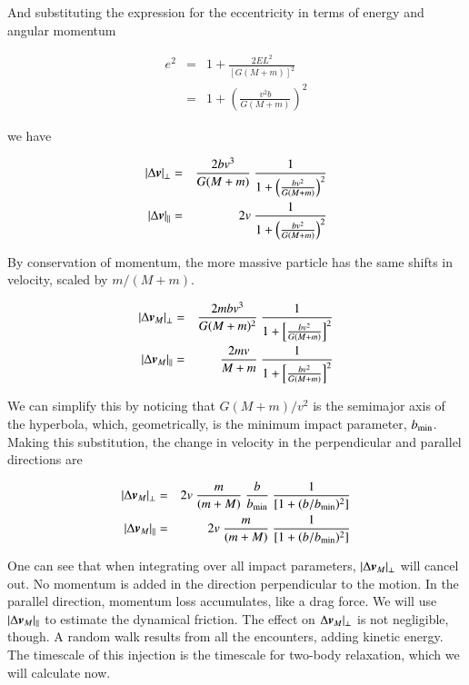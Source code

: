 And substituting the expression for the eccentricity in terms of energy and angular momentum

\begin{eqnarray}
e^2 &=& 1 + \frac{2EL^2}{[G(M+m)]^2} \\
    &=& 1 + \left(\frac{v^2b}{G(M+m)}\right)^2
\end{eqnarray}


we have 

\begin{eqnarray}
|\Delta \v{v}|_\perp &=& \frac{2bv^3}{G(M+m)} \ \frac{1}{1+  \left(\frac{bv^2}{G(M+m)}\right)^2       }\\
|\Delta \v{v}|_{||} &=& 2v \ \frac{1}{ 1+  \left(\frac{bv^2}{G(M+m)}\right)^2   }
\end{eqnarray}

By conservation of momentum, the more massive particle has the same shifts in velocity, scaled by $m/(M+m)$. 


\begin{eqnarray}
|\Delta \v{v}_{M}|_\perp &=& \frac{2mbv^3}{G(M+m)^2} \ \frac{1}{1+  \left[\frac{bv^2}{G(M+m)}\right]^2       }\\
|\Delta \v{v}_{M}|_{||} &=& \frac{2mv}{M+m} \ \frac{1}{ 1+  \left[\frac{bv^2}{G(M+m)}\right]^2   }
\end{eqnarray}

We can simplify this by noticing that $G(M+m)/v^2$ is the semimajor axis of the hyperbola, which, geometrically, is the minimum impact parameter, $b_{\rm min}$. Making this substitution, the change in velocity in the perpendicular and parallel directions are 


\begin{eqnarray}
|\Delta \v{v}_{M}|_\perp &=& 2v \ \frac{m}{(m+M)} \ \frac{b}{b_{\rm min}}\ \frac{1}{[1+(b/b_{\rm min})^2]}\\
|\Delta \v{v}_{M}|_{||} &=& 2v \ \frac{m}{(m+M)} \ \frac{1}{[1+(b/b_{\rm min})^2]}
\end{eqnarray}

One can see that when integrating over all impact parameters, $|\Delta {\boldsymbol{v}}_{M}|_\perp$ will cancel out. No momentum is added in the direction perpendicular to the motion. In the parallel direction, momentum loss accumulates, like a drag force. We will use $|\Delta {\boldsymbol{v}}_{M}|_{||}$ to estimate the dynamical friction. The effect on $\Delta {\boldsymbol{v}}_{M}|_\perp$ is not negligible, though. A random walk results from all the encounters, adding kinetic energy. The timescale of this injection is the timescale for two-body relaxation, which we will calculate now. 


